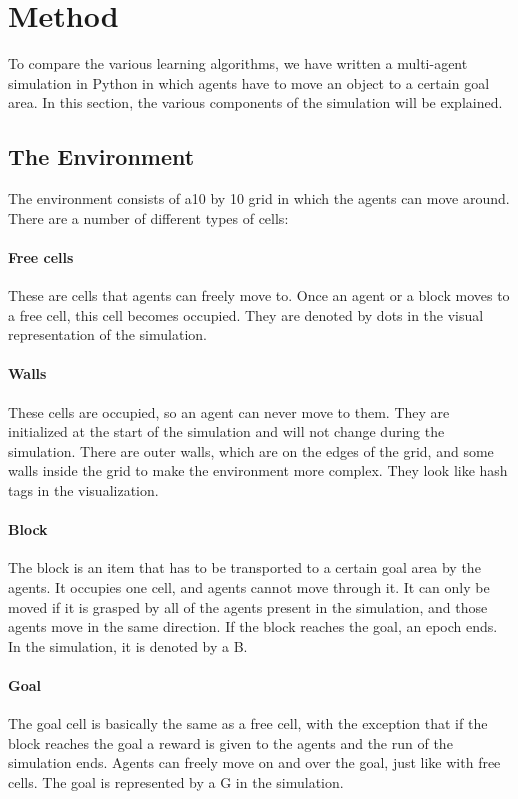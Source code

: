 \section{Method}
To compare the various learning algorithms, we have written a multi-agent simulation in Python in which agents have to move an object to a certain goal area. In this section, the various components of the simulation will be explained.
\subsection{The Environment}
The environment consists of a10 by 10 grid in which the agents can move around. There are a number of different types of cells:
\paragraph{Free cells}
These are cells that agents can freely move to. Once an agent or a block moves to a free cell, this cell becomes occupied. They are denoted by dots in the visual representation of the simulation.
\paragraph{Walls}
These cells are occupied, so an agent can never move to them. They are initialized at the start of the simulation and will not change during the simulation. There are outer walls, which are on the edges of the grid, and some walls inside the grid to make the environment more complex. They look like hash tags in the visualization.
\paragraph{Block}
The block is an item that has to be transported to a certain goal area by the agents. It occupies one cell, and agents cannot move through it. It can only be moved if it is grasped by all of the agents present in the simulation, and those agents move in the same direction. If the block reaches the goal, an epoch ends. In the simulation, it is denoted by a B.
\paragraph{Goal}
The goal cell is basically the same as a free cell, with the exception that if the block reaches the goal a reward is given to the agents and the run of the simulation ends. Agents can freely move on and over the goal, just like with free cells. The goal is represented by a G in the simulation.
